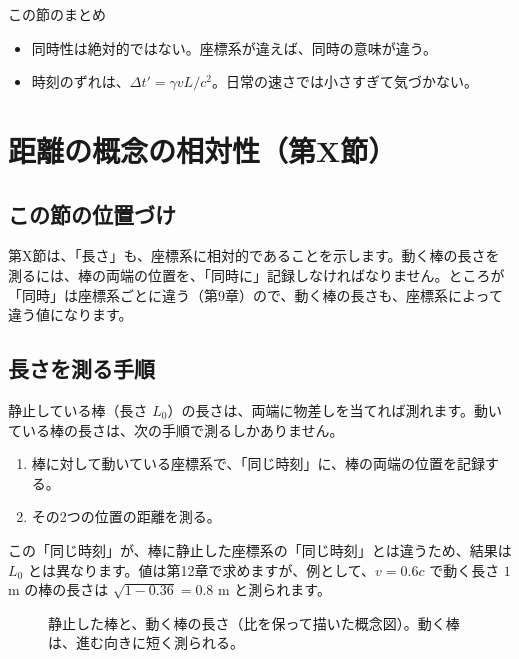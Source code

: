 \documentclass[a4paper,11pt,openany]{ltjsbook}
\begin{document}
\begin{pointbox}{この節のまとめ}
\begin{itemize}[leftmargin=*]
\item 同時性は絶対的ではない。座標系が違えば、同時の意味が違う。
\item 時刻のずれは、$\Delta t'=\gamma vL/c^2$。日常の速さでは小さすぎて気づかない。
\end{itemize}
\end{pointbox}

\chapter{距離の概念の相対性（第X節）}

\section{この節の位置づけ}

第X節は、「長さ」も、座標系に相対的であることを示します。動く棒の長さを測るには、棒の両端の位置を、「同時に」記録しなければなりません。ところが「同時」は座標系ごとに違う（第9章）ので、動く棒の長さも、座標系によって違う値になります。

\section{長さを測る手順}

静止している棒（長さ $L_0$）の長さは、両端に物差しを当てれば測れます。動いている棒の長さは、次の手順で測るしかありません。

\begin{enumerate}[leftmargin=*]
\item 棒に対して動いている座標系で、「同じ時刻」に、棒の両端の位置を記録する。
\item その2つの位置の距離を測る。
\end{enumerate}

この「同じ時刻」が、棒に静止した座標系の「同じ時刻」とは違うため、結果は $L_0$ とは異なります。値は第12章で求めますが、例として、$v=0.6c$ で動く長さ $1$ m の棒の長さは $\sqrt{1-0.36}=0.8$ m と測られます。

\begin{figure}[htbp]
\centering
{}
\caption{静止した棒と、動く棒の長さ（比を保って描いた概念図）。動く棒は、進む向きに短く測られる。}
\end{figure}
\end{document}
